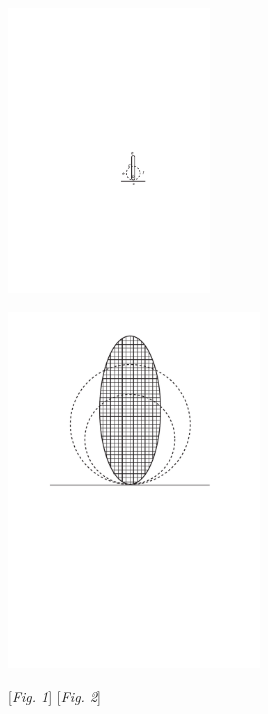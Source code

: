 \pend
\vspace*{3.0em}
\pstart
\noindent
\begin{minipage}[t]{0.5\textwidth}
\hspace*{20mm}
\includegraphics[trim = 0mm 2.9mm 0mm 0mm, clip, width=0.4\textwidth]{images/LH03704_50r-d1.pdf}
\end{minipage}
\hspace{5mm}
\begin{minipage}[t]{0.5\textwidth}
\includegraphics[width=0.5\textwidth]{images/LH03704_50r-d2.pdf}\\
\end{minipage}
\hspace*{28mm} [\textit{Fig. 1}]\hspace*{44mm} [\textit{Fig. 2}]
\pend
\count{}
\count{}
\count{}